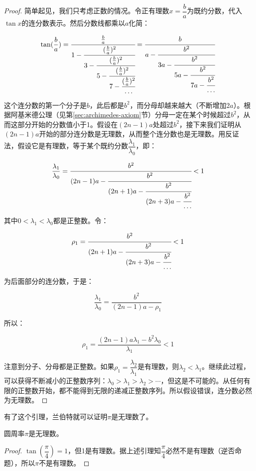 \documentclass[b5paper]{ctexart}
\begin{document}
\begin{proof}
简单起见，我们只考虑正数的情况。令正有理数$x = \dfrac{b}{a}$为既约分数，代入$\tan x$的连分数表示。然后分数线都乘以$a$化简：

\[
\tan(\frac{b}{a}) = \cfrac{\frac{b}{a}}{1 - \cfrac{(\frac{b}{a})^2}{3 - \cfrac{(\frac{b}{a})^2}{5 - \cfrac{(\frac{b}{a})^2}{7 - \cfrac{(\frac{b}{a})^2}{\dotso}}}}} =
\cfrac{b}{a - \cfrac{b^2}{3a - \cfrac{b^2}{5a - \cfrac{b^2}{7a - \cfrac{b^2}{\dotso}}}}}
\]

这个连分数的第一个分子是$b$，此后都是$b^2$，而分母却越来越大（不断增加$2a$）。根据阿基米德公理（见第\ref{sec:archimedes-axiom}节）分母一定在某个时候超过$b^2$，从而这部分开始的分数值小于1。假设在$(2n - 1)a$处超过$b^2$，接下来我们证明从$(2n - 1)a$开始的部分连分数是无理数，从而整个连分数也是无理数。用反证法，假设它是有理数，等于某个既约分数$\dfrac{\lambda_1}{\lambda_0}$，即：

\[
\frac{\lambda_1}{\lambda_0} = \cfrac{b^2}{(2n - 1)a - \cfrac{b^2}{(2n + 1)a - \cfrac{b^2}{(2n + 3)a - \cfrac{b^2}{\dotso}}}} < 1
\]

其中$0 < \lambda_1 < \lambda_0$都是正整数。令：

\[
\rho_1 = \cfrac{b^2}{(2n + 1)a - \cfrac{b^2}{(2n + 3)a - \cfrac{b^2}{\dotso}}} < 1
\]

为后面部分的连分数，于是：

\[
\frac{\lambda_1}{\lambda_0} = \frac{b^2}{(2n - 1)a - \rho_1}
\]

所以：

\[
\rho_1 = \frac{(2n - 1)a\lambda_1 - b^2\lambda_0}{\lambda_1} < 1
\]

注意到分子、分母都是正整数。如果$\rho_1 = \dfrac{\lambda_2}{\lambda_1}$是有理数，则$\lambda_2 < \lambda_1$。继续此过程，可以获得不断减小的正整数序列：$\lambda_0 > \lambda_1 > \lambda_2 > \dotsb$，但这是不可能的。从任何有限的正整数开始，都不能得到无限的递减正整数序列。所以假设错误，连分数必然为无理数。
\end{proof}

有了这个引理，兰伯特就可以证明$\pi$是无理数了。

\begin{theorem}[兰伯特]
圆周率$\pi$是无理数。
\end{theorem}

\begin{proof}
$\tan(\dfrac{\pi}{4}) = 1$，但1是有理数。据上述引理知$\dfrac{\pi}{4}$必然不是有理数（逆否命题），所以$\pi$不是有理数。
\end{proof}
\end{document}

